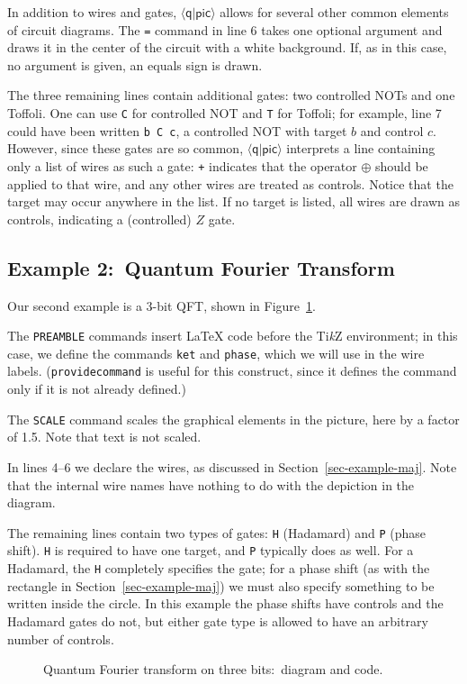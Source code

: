 \documentclass[twoside,12pt]{article}
\newcommand{\qpic}{$\langle\mathsf{q}|\mathsf{pic}\rangle$\xspace}
\newcommand{\TikZ}{Ti\emph{k}Z\xspace}
\begin{document}
In addition to wires and gates, \qpic allows for several other common
elements of circuit diagrams.  The {\tt =} command in line 6 takes one
optional argument and draws it in the center of the circuit with a white
background.  If, as in this case, no argument is given, an equals sign is
drawn.


The three remaining lines contain additional gates: two controlled NOTs and
one Toffoli.  One can use {\tt C} for controlled NOT and {\tt T} for
Toffoli; for example, line 7 could have been written {\tt b C c}, a
controlled NOT with target $b$ and control $c$.  However, since these gates
are so common, \qpic interprets a line containing only a list of wires as
such a gate:  {\tt +} indicates that the operator $\oplus$ should be
applied to that wire, and any other wires are treated as controls.
Notice that the target may occur anywhere in the list.  If no target is
listed, all wires are drawn as controls, indicating a (controlled)
$Z$ gate.

\subsection{Example 2:\ Quantum Fourier Transform}
\label{sec-example-QFT}

Our second example is a 3-bit QFT, shown in Figure~\ref{fig-QFT}.



The {\tt PREAMBLE} commands insert {\LaTeX} code before the
\TikZ environment; in this case, we define the commands {\tt {}ket}
and {\tt {}phase}, which we will use in the wire labels.
({\tt {}providecommand} is
useful for this construct, since it defines the command only if it is not
already defined.)



The {\tt SCALE} command scales the graphical elements in the picture,
here by a factor of 1.5.  Note that text is not scaled.


In lines 4--6 we declare the wires, as discussed in
Section~\ref{sec-example-maj}.  Note that the internal wire names have
nothing to do with the depiction in the diagram.

The remaining lines contain two types of gates:
{\tt H} (Hadamard) and {\tt P} (phase shift).  {\tt H} is required to have
one target, and {\tt P} typically does as well.
For a Hadamard, the {\tt H} completely specifies the gate;
for a phase shift (as with the rectangle in Section~\ref{sec-example-maj})
we must also specify something to be written inside the circle.  In this
example the phase shifts have controls and the Hadamard gates do not, but
either gate type is allowed to have an arbitrary number of controls.
\begin{figure}[h!]
\begin{center}


\begin{minipage}{5in}

\end{minipage}
\end{center}
\caption{Quantum Fourier transform on three bits:\ diagram and code.}
\label{fig-QFT}
\end{figure}
\end{document}
